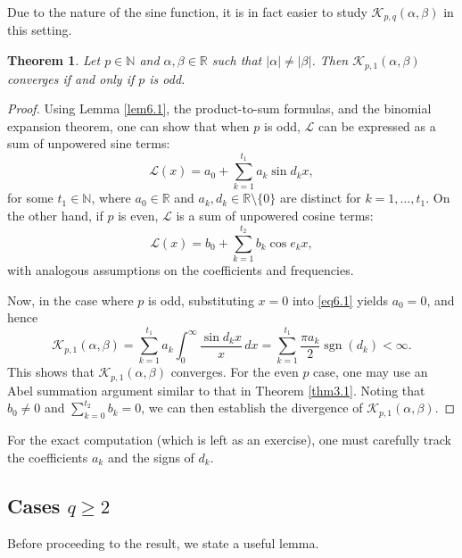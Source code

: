 \documentclass[12pt, reqno]{amsart}
\theoremstyle{plain}
\newtheorem{theorem}{Theorem}[section]
\theoremstyle{definition}
\begin{document}
Due to the nature of the sine function, it is in fact easier to study $\mathcal{K}_{p, q}(\alpha, \beta)$ in this setting. 


\begin{theorem}
    Let $p\in\mathbb{N}$ and $\alpha, \beta\in\mathbb{R}$ such that $|\alpha|\ne|\beta|$. Then $\mathcal{K}_{p, 1}(\alpha, \beta)$ converges if and only if $p$ is odd.
\end{theorem}
\begin{proof}
    Using Lemma \ref{lem6.1}, the product-to-sum formulas, and the binomial expansion theorem, one can show that when $p$ is odd, $\mathcal{L}$ can be expressed as a sum of unpowered sine terms:
\begin{equation}\label{eq6.1}
\mathcal{L}(x) = a_0 + \sum_{k=1}^{t_1} a_k \sin d_k x,
\end{equation}
for some $t_1 \in \mathbb{N}$, where $a_0 \in \mathbb{R}$ and $a_k, d_k \in \mathbb{R} \setminus \{0\}$ are distinct for $k = 1, \ldots, t_1$.
On the other hand, if $p$ is even, $\mathcal{L}$ is a sum of unpowered cosine terms:
\begin{equation}\label{eq6.2}
\mathcal{L}(x) = b_0 + \sum_{k=1}^{t_2} b_k \cos e_k x ,
\end{equation}
with analogous assumptions on the coefficients and frequencies.

Now, in the case where $p$ is odd, substituting $x = 0$ into \eqref{eq6.1} yields $a_0 = 0$, and hence
\[
\mathcal{K}_{p, 1}(\alpha, \beta)
= \sum_{k=1}^{t_1} a_k \int_0^{\infty} \frac{\sin d_k x}{x}\, dx
= \sum_{k=1}^{t_1} \frac{\pi a_k}{2} \operatorname{sgn}(d_k)
< \infty.
\]
This shows that $\mathcal{K}_{p, 1}(\alpha, \beta)$ converges.
For the even $p$ case, one may use an Abel summation argument similar to that in Theorem \ref{thm3.1}. Noting that $b_0\ne 0$ and $\sum_{k=0}^{t_2} b_k = 0$, we can then establish the divergence of $\mathcal{K}_{p, 1}(\alpha, \beta)$.
\end{proof}


For the exact computation (which is left as an exercise), one must carefully track the coefficients $a_k$ and the signs of $d_k$.





\subsection{Cases $q\ge 2$}

Before proceeding to the result, we state a useful lemma.
\end{document}
